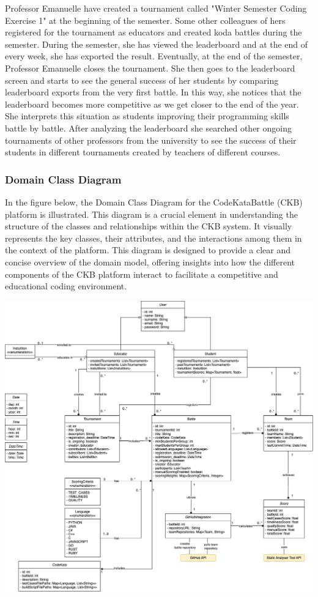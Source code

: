 \begin{enumerate}
    Professor Emanuelle have created a tournament called "Winter Semester Coding Exercise 1" at the beginning of the semester. Some other colleagues of hers registered for the tournament as educators and created koda battles during the semester. During the semester, she has viewed the leaderboard and at the end of every week, she has exported the result. Eventually, at the end of the semester, Professor Emanuelle closes the tournament. She then goes to the leaderboard screen and starts to see the general success of her students by comparing leaderboard exports from the very first battle. In this way, she notices that the leaderboard becomes more competitive as we get closer to the end of the year. She interprets this situation as students improving their programming skills battle by battle. After analyzing the leaderboard she searched other ongoing tournaments of other professors from the university to see the success of their students in different tournaments created by teachers of different courses.
    
\end{enumerate}
\newpage
\subsubsection{Domain Class Diagram}
In the figure below, the Domain Class Diagram for the CodeKataBattle (CKB) platform is illustrated. This diagram is a crucial element in understanding the structure of the classes and relationships within the CKB system. It visually represents the key classes, their attributes, and the interactions among them in the context of the platform. This diagram is designed to provide a clear and concise overview of the domain model, offering insights into how the different components of the CKB platform interact to facilitate a competitive and educational coding environment. 

\begin{center}
\includegraphics[width=\textwidth,height=\textheight,keepaspectratio]{Images/class-diagram.png}
\end{center}

